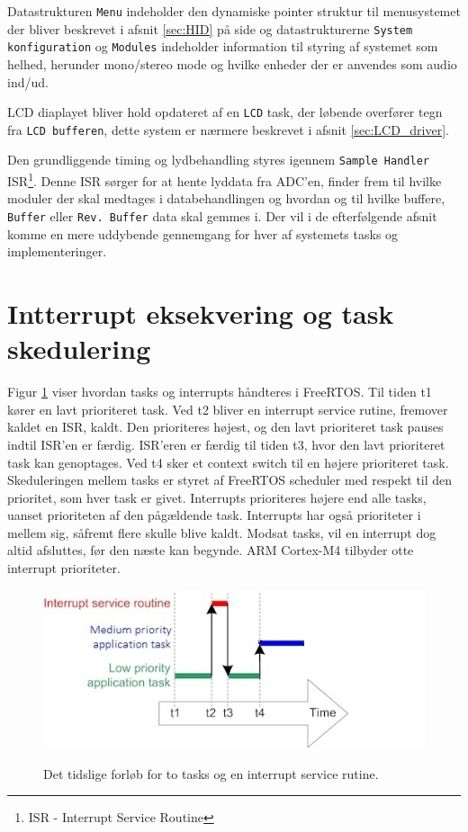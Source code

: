 Datastrukturen \texttt{Menu} indeholder den dynamiske pointer struktur til menusystemet der bliver beskrevet i afsnit \ref{sec:HID} på side \pageref{sec:HID} og datastrukturerne \texttt{System konfiguration} og \texttt{Modules} indeholder information til styring af systemet som helhed, herunder mono/stereo mode og hvilke enheder der er anvendes som audio ind/ud.

LCD diaplayet bliver hold opdateret af en \texttt{LCD} task, der løbende overfører tegn fra \texttt{LCD bufferen}, dette system er nærmere beskrevet i afsnit \ref{sec:LCD_driver}.

Den grundliggende timing og lydbehandling styres igennem \texttt{Sample Handler} ISR\footnote{ISR - Interrupt Service Routine}.
Denne ISR sørger for at hente lyddata fra ADC'en, finder frem til hvilke moduler der skal medtages i databehandlingen og hvordan og til hvilke buffere, \texttt{Buffer} eller \texttt{Rev. Buffer} data skal gemmes i.
Der vil i de efterfølgende afsnit komme en mere uddybende gennemgang for hver af systemets tasks og implementeringer. 


\section{Intterrupt eksekvering og task skedulering}
\label{subsec:int_task}
Figur \ref{fig:int_task} viser hvordan tasks og interrupts håndteres i FreeRTOS. 
Til tiden t1 kører en lavt prioriteret task. 
Ved t2 bliver en interrupt service rutine, fremover kaldet en ISR, kaldt. 
Den prioriteres højest, og den lavt prioriteret task pauses indtil ISR'en er færdig.
ISR'eren er færdig til tiden t3, hvor den lavt prioriteret task kan genoptages.
Ved t4 sker et context switch til en højere prioriteret task.
Skeduleringen mellem tasks er styret af FreeRTOS scheduler med respekt til den prioritet, som hver task er givet. 
Interrupts prioriteres højere end alle tasks, uanset prioriteten af den pågældende task. 
Interrupts har også prioriteter i mellem sig, såfremt flere skulle blive kaldt. 
Modsat tasks, vil en interrupt dog altid afsluttes, før den næste kan begynde. 
ARM Cortex-M4 tilbyder otte interrupt prioriteter. 
\begin{figure}[h]
	\caption{Det tidslige forløb for to tasks og en interrupt service rutine. }
	\centering
	\includegraphics[width=0.6\linewidth]{billeder/interruptandtaskprocessing.jpg}
	\label{fig:int_task}
\end{figure}

